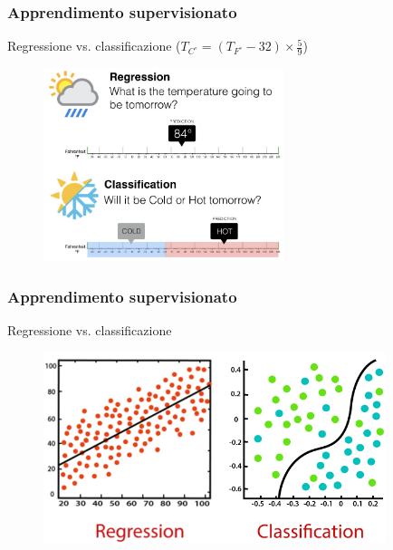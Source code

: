 \begin{frame}

	\frametitle{Apprendimento supervisionato}

	\begin{block}{Regressione vs. classificazione ($T_{C^{\circ}} = (T_{F^{\circ}} - 32) \times \frac{5}{9}$)}
		\begin{figure}[!htbp]
			\centering
			\includegraphics[width=7cm]{images/glossary/regression_vs_classification_2.png}
		\end{figure}

	\end{block}

\end{frame}


\begin{frame}

	\frametitle{Apprendimento supervisionato}

	\begin{block}{Regressione vs. classificazione}
		\begin{figure}[!htbp]
			\centering
			\includegraphics[width=10cm]{images/glossary/regression_vs_classification_1.png}
		\end{figure}

	\end{block}

\end{frame}



